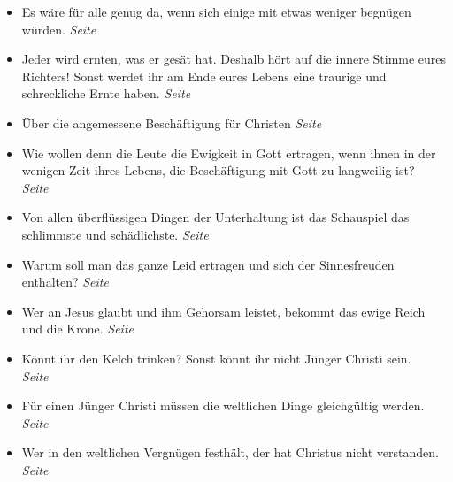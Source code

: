 \begin{itemize}
\begin{itemize}
 \item Es wäre für alle genug da, wenn sich einige mit etwas weniger begnügen
würden.
 \dotfill \textit{Seite~\pageref{ref:15_02_genug_fuer_alle}}\\

 \item Jeder wird ernten, was er gesät hat. Deshalb hört auf die innere Stimme
eures Richters! Sonst werdet ihr am Ende eures Lebens eine traurige und
schreckliche Ernte haben.
 \dotfill \textit{Seite~\pageref{ref:15_04_innere_stimme}}\\

 \item Über die angemessene Beschäftigung für Christen
 \dotfill \textit{Seite~\pageref{ref:15_05_freizeitbeschaeftigung}}\\

 \item Wie wollen denn die Leute die Ewigkeit in Gott ertragen, wenn ihnen in der
wenigen Zeit ihres Lebens, die Beschäftigung mit Gott zu langweilig ist?
 \dotfill \textit{Seite~\pageref{ref:15_06_langeweile}}\\

 \item Von allen überflüssigen Dingen der Unterhaltung ist das Schauspiel das schlimmste und schädlichste.
 \dotfill \textit{Seite~\pageref{ref:15_08_schauspiel}}\\

 \item Warum soll man das ganze Leid ertragen und sich der Sinnesfreuden
enthalten?
 \dotfill \textit{Seite~\pageref{ref:16_01_warum}}\\

 \item Wer an Jesus glaubt und ihm Gehorsam leistet, bekommt das ewige Reich und
die Krone.
 \dotfill \textit{Seite~\pageref{ref:16_01_warum_2}}\\

 \item Könnt ihr den Kelch trinken? Sonst könnt ihr nicht Jünger Christi sein.
 \dotfill \textit{Seite~\pageref{ref:16_03_kelch_tringen}}\\

 \item Für einen Jünger Christi müssen die weltlichen Dinge gleichgültig werden.
 \dotfill \textit{Seite~\pageref{ref:16_05_weltliches}}\\

 \item Wer in den weltlichen Vergnügen festhält, der hat Christus nicht verstanden.
 \dotfill \textit{Seite~\pageref{ref:16_05_weltliches_2}}\\


\end{itemize}
\end{itemize}
